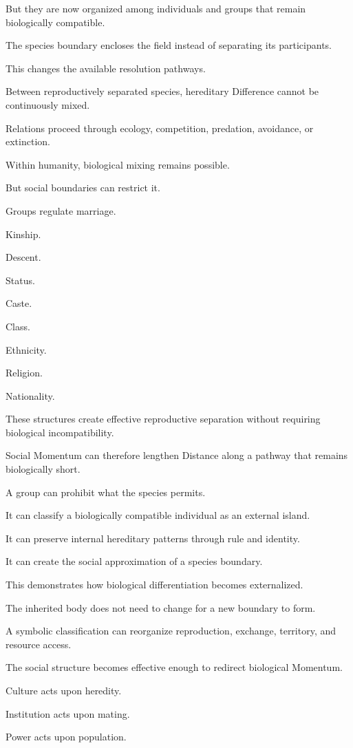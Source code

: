 But they are now organized among individuals and groups that remain biologically compatible.

The species boundary encloses the field instead of separating its participants.

This changes the available resolution pathways.

Between reproductively separated species, hereditary Difference cannot be continuously mixed.

Relations proceed through ecology, competition, predation, avoidance, or extinction.

Within humanity, biological mixing remains possible.

But social boundaries can restrict it.

Groups regulate marriage.

Kinship.

Descent.

Status.

Caste.

Class.

Ethnicity.

Religion.

Nationality.

These structures create effective reproductive separation without requiring biological incompatibility.

Social Momentum can therefore lengthen Distance along a pathway that remains biologically short.

A group can prohibit what the species permits.

It can classify a biologically compatible individual as an external island.

It can preserve internal hereditary patterns through rule and identity.

It can create the social approximation of a species boundary.

This demonstrates how biological differentiation becomes externalized.

The inherited body does not need to change for a new boundary to form.

A symbolic classification can reorganize reproduction, exchange, territory, and resource access.

The social structure becomes effective enough to redirect biological Momentum.

Culture acts upon heredity.

Institution acts upon mating.

Power acts upon population.

